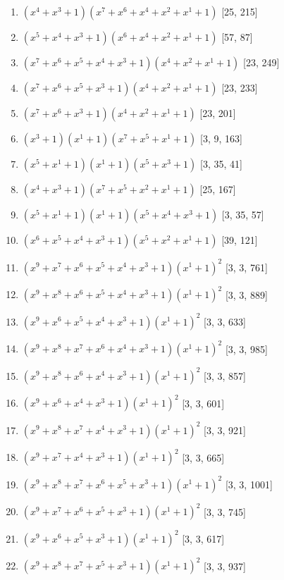 \documentclass[10pt,twocolumn]{article}
\begin{document}
\begin{enumerate}
\item $(x^{4} + x^{3} + 1)(x^{7} + x^{6} + x^{4} + x^{2} + x^{1} + 1)$  [25, 215]
\item $(x^{5} + x^{4} + x^{3} + 1)(x^{6} + x^{4} + x^{2} + x^{1} + 1)$  [57, 87]
\item $(x^{7} + x^{6} + x^{5} + x^{4} + x^{3} + 1)(x^{4} + x^{2} + x^{1} + 1)$  [23, 249]
\item $(x^{7} + x^{6} + x^{5} + x^{3} + 1)(x^{4} + x^{2} + x^{1} + 1)$  [23, 233]
\item $(x^{7} + x^{6} + x^{3} + 1)(x^{4} + x^{2} + x^{1} + 1)$  [23, 201]
\item $(x^{3} + 1)(x^{1} + 1)(x^{7} + x^{5} + x^{1} + 1)$  [3, 9, 163]
\item $(x^{5} + x^{1} + 1)(x^{1} + 1)(x^{5} + x^{3} + 1)$  [3, 35, 41]
\item $(x^{4} + x^{3} + 1)(x^{7} + x^{5} + x^{2} + x^{1} + 1)$  [25, 167]
\item $(x^{5} + x^{1} + 1)(x^{1} + 1)(x^{5} + x^{4} + x^{3} + 1)$  [3, 35, 57]
\item $(x^{6} + x^{5} + x^{4} + x^{3} + 1)(x^{5} + x^{2} + x^{1} + 1)$  [39, 121]
\item $(x^{9} + x^{7} + x^{6} + x^{5} + x^{4} + x^{3} + 1)(x^{1} + 1)^{2}$  [3, 3, 761]
\item $(x^{9} + x^{8} + x^{6} + x^{5} + x^{4} + x^{3} + 1)(x^{1} + 1)^{2}$  [3, 3, 889]
\item $(x^{9} + x^{6} + x^{5} + x^{4} + x^{3} + 1)(x^{1} + 1)^{2}$  [3, 3, 633]
\item $(x^{9} + x^{8} + x^{7} + x^{6} + x^{4} + x^{3} + 1)(x^{1} + 1)^{2}$  [3, 3, 985]
\item $(x^{9} + x^{8} + x^{6} + x^{4} + x^{3} + 1)(x^{1} + 1)^{2}$  [3, 3, 857]
\item $(x^{9} + x^{6} + x^{4} + x^{3} + 1)(x^{1} + 1)^{2}$  [3, 3, 601]
\item $(x^{9} + x^{8} + x^{7} + x^{4} + x^{3} + 1)(x^{1} + 1)^{2}$  [3, 3, 921]
\item $(x^{9} + x^{7} + x^{4} + x^{3} + 1)(x^{1} + 1)^{2}$  [3, 3, 665]
\item $(x^{9} + x^{8} + x^{7} + x^{6} + x^{5} + x^{3} + 1)(x^{1} + 1)^{2}$  [3, 3, 1001]
\item $(x^{9} + x^{7} + x^{6} + x^{5} + x^{3} + 1)(x^{1} + 1)^{2}$  [3, 3, 745]
\item $(x^{9} + x^{6} + x^{5} + x^{3} + 1)(x^{1} + 1)^{2}$  [3, 3, 617]
\item $(x^{9} + x^{8} + x^{7} + x^{5} + x^{3} + 1)(x^{1} + 1)^{2}$  [3, 3, 937]

\end{enumerate}
\end{document}
